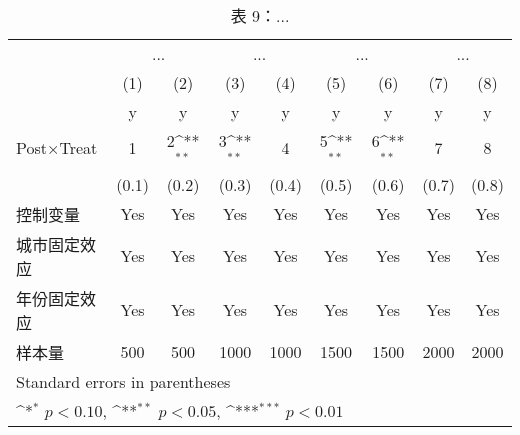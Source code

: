 \begin{table}[htbp]\centering
\def\sym#1{\ifmmode^{#1}\else\(^{#1}\)\fi}
\caption{表 9：...}
\begin{tabular}{l*{8}{c}}
\hline\hline
                         &\multicolumn{2}{c}{...}             &\multicolumn{2}{c}{...}             &\multicolumn{2}{c}{...}             &\multicolumn{2}{c}{...}             \\\cmidrule(lr){2-3}\cmidrule(lr){4-5}\cmidrule(lr){6-7}\cmidrule(lr){8-9}
                         &\multicolumn{1}{c}{(1)}&\multicolumn{1}{c}{(2)}&\multicolumn{1}{c}{(3)}&\multicolumn{1}{c}{(4)}&\multicolumn{1}{c}{(5)}&\multicolumn{1}{c}{(6)}&\multicolumn{1}{c}{(7)}&\multicolumn{1}{c}{(8)}\\
                         &\multicolumn{1}{c}{y}&\multicolumn{1}{c}{y}&\multicolumn{1}{c}{y}&\multicolumn{1}{c}{y}&\multicolumn{1}{c}{y}&\multicolumn{1}{c}{y}&\multicolumn{1}{c}{y}&\multicolumn{1}{c}{y}\\
\hline
Post×Treat               &       1        &       2\sym{**} &      3\sym{**} &      4        &       5\sym{**} &       6\sym{**} &     7        & 8 \\
                         &     (0.1)         &     (0.2)         &     (0.3)         &     (0.4)         &     (0.5)         &     (0.6)     &     (0.7)         & (0.8)    \\
\hline
控制变量                 &         Yes         &         Yes         &         Yes         &         Yes         &         Yes         &         Yes         &         Yes         &         Yes         \\
城市固定效应             &         Yes         &         Yes         &         Yes         &         Yes         &         Yes         &         Yes         &         Yes         &         Yes         \\
年份固定效应             &         Yes         &         Yes         &         Yes         &         Yes         &         Yes         &         Yes         &         Yes         &         Yes         \\
样本量                   &         500         &         500         &       1000       &        1000        &        1500      &       1500        &        2000      &        2000         \\
\hline\hline
\multicolumn{9}{l}{\footnotesize Standard errors in parentheses}\\
\multicolumn{9}{l}{\footnotesize \sym{*} \(p<0.10\), \sym{**} \(p<0.05\), \sym{***} \(p<0.01\)}\\
\end{tabular}
\end{table}
